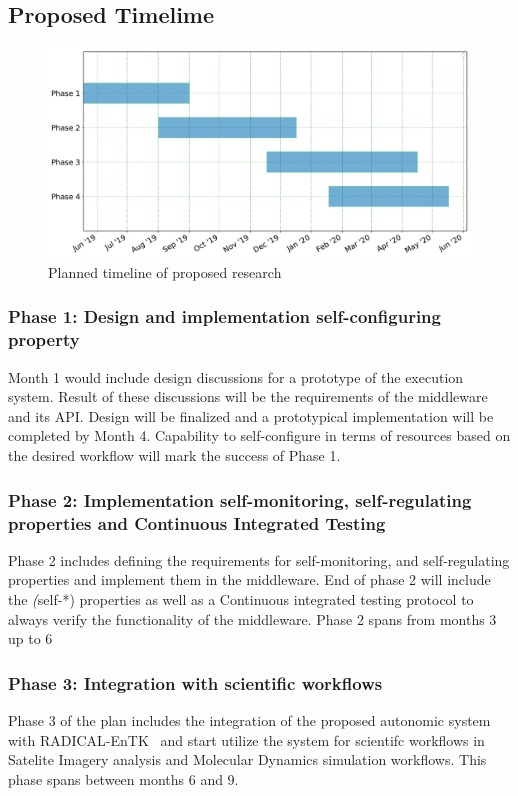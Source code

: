 \subsection{Proposed Timelime}
\begin{figure}[t]
	\centering
	\includegraphics[width=.95\textwidth]{./phd_plan.pdf}
	\caption{Planned timeline of proposed research}\label{tab:work_plan}
\end{figure}

\subsubsection{Phase 1: Design and implementation self-configuring property}

Month 1 would include design discussions for a prototype of the execution system. 
Result of these discussions will be the requirements of the middleware and its 
API. Design will be finalized and a prototypical implementation will be completed 
by Month 4. Capability to self-configure in terms of resources based on the desired 
workflow will mark the success of Phase 1.

\subsubsection{Phase 2: Implementation self-monitoring, self-regulating properties
and Continuous Integrated Testing}
Phase 2 includes defining the requirements for self-monitoring, and self-regulating 
properties and implement them in the middleware. End of phase 2 will include the 
\textit(self-*) properties as well as a Continuous integrated testing protocol to 
always verify the functionality of the middleware. Phase 2 spans from months 3 up 
to 6

\subsubsection{Phase 3: Integration with scientific workflows}
Phase 3 of the plan includes the integration of the proposed autonomic system with 
RADICAL-EnTK~\cite{balasubramanian2018harnessing} and start utilize the system for 
scientifc workflows in Satelite Imagery analysis and Molecular Dynamics simulation 
workflows. This phase spans between months 6 and 9.

